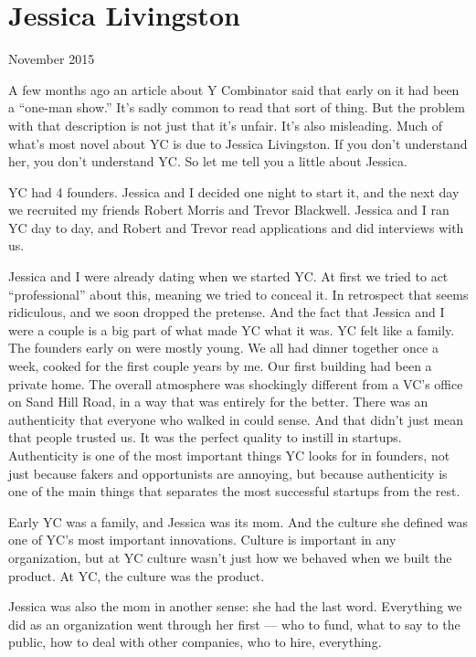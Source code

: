 \chapter{Jessica Livingston}

November 2015

A few months ago an article about Y Combinator said that early on it had
been a ``one-man show.'' It's sadly common to read that sort of thing.
But the problem with that description is not just that it's unfair. It's
also misleading. Much of what's most novel about YC is due to Jessica
Livingston. If you don't understand her, you don't understand YC. So let
me tell you a little about Jessica.

YC had 4 founders. Jessica and I decided one night to start it, and the
next day we recruited my friends Robert Morris and Trevor Blackwell.
Jessica and I ran YC day to day, and Robert and Trevor read applications
and did interviews with us.

Jessica and I were already dating when we started YC. At first we tried
to act ``professional'' about this, meaning we tried to conceal it. In
retrospect that seems ridiculous, and we soon dropped the pretense. And
the fact that Jessica and I were a couple is a big part of what made YC
what it was. YC felt like a family. The founders early on were mostly
young. We all had dinner together once a week, cooked for the first
couple years by me. Our first building had been a private home. The
overall atmosphere was shockingly different from a VC's office on Sand
Hill Road, in a way that was entirely for the better. There was an
authenticity that everyone who walked in could sense. And that didn't
just mean that people trusted us. It was the perfect quality to instill
in startups. Authenticity is one of the most important things YC looks
for in founders, not just because fakers and opportunists are annoying,
but because authenticity is one of the main things that separates the
most successful startups from the rest.

Early YC was a family, and Jessica was its mom. And the culture she
defined was one of YC's most important innovations. Culture is important
in any organization, but at YC culture wasn't just how we behaved when
we built the product. At YC, the culture was the product.

Jessica was also the mom in another sense: she had the last word.
Everything we did as an organization went through her first --- who to
fund, what to say to the public, how to deal with other companies, who
to hire, everything.

